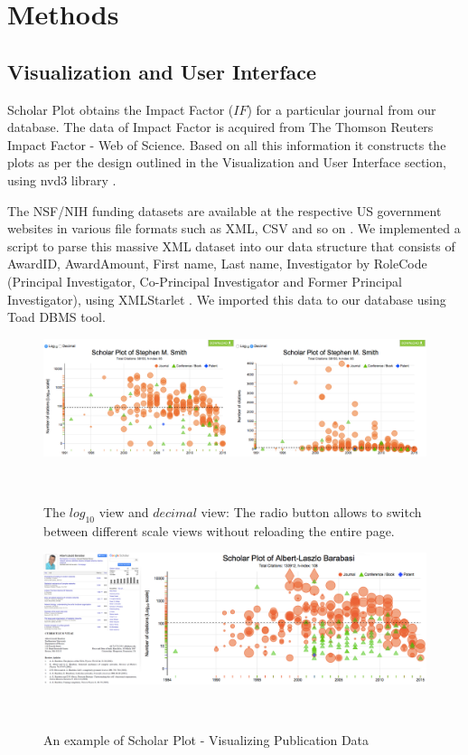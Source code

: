 \chapter{Methods}\label{chap:Methods }


\section{Visualization and User Interface}
Scholar Plot obtains the Impact Factor ($IF$) for a particular journal from our database. The data of Impact Factor is acquired from The Thomson Reuters Impact Factor - Web of Science. Based on all this information it constructs the plots as per the design outlined in the Visualization and User Interface section, using nvd3 library \cite{nvd3org}.


The NSF/NIH funding datasets are available at the respective US government websites in various file formats such as XML, CSV and so on \cite{nsf, nih}. We implemented a script to parse this massive XML dataset into our data structure that consists of AwardID, AwardAmount, First name, Last name, Investigator by RoleCode (Principal Investigator, Co-Principal Investigator and Former Principal Investigator), using XMLStarlet \cite{XMLStarlet}. We imported this data to our database using Toad DBMS tool. %

\begin{figure}%
\centering
  \includegraphics[width=1\columnwidth]{figures/fig_scaleView}
  \caption{The $log_{10}$ view and $decimal$ view: The radio button allows to switch between different scale views without reloading the entire page.}~\label{fig:fig-scale}
\end{figure}

\begin{figure}
  \centering
  \includegraphics[width=2\columnwidth]{figures/fig_cv_google_scholarplot}
  \caption{An example of Scholar Plot - Visualizing Publication Data}~\label{fig:fig-publication}
\end{figure}

